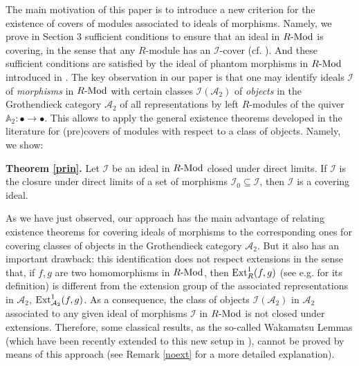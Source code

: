 \documentclass[11pt]{amsart}
\begin{document}
{The main motivation of this paper is to introduce a new criterion for the existence of covers of modules associated to ideals of morphisms. Namely, we prove in Section 3  sufficient conditions to ensure  that an ideal in $R{\textrm{-}{\rm Mod}}$ is covering, in the sense that any $R$-module has an $\mathcal I$-cover (cf. \cite{FGHT}). And these sufficient conditions are satisfied by the ideal of phantom morphisms in $R{\textrm{-}{\rm Mod}}$ introduced in \cite{Herzog1}. The key observation in our paper is that one may identify ideals $\mathcal I$ of \emph{morphisms} in $R{\textrm{-}{\rm Mod}}$ with certain classes ${\mathcal I(\mathcal A_2)}$ of \emph{objects} in the Grothendieck category $\mathcal A_2$ of all representations by left $R$-modules of the quiver $\mathbb{A}_2:\bullet\to \bullet$. This allows to apply the general existence theorems developed in the literature for (pre)covers of modules with respect to a class of objects. Namely, we show:

\medskip\par\noindent
{\bf Theorem \ref{prin}.} Let $\mathcal I$ be an ideal in $R{\textrm{-}{\rm Mod}}$ closed under direct limits. If $\mathcal I$ is the closure under direct limits of a set of morphisms $\mathcal I_0\subseteq\mathcal I$, then $\mathcal I$ is a covering ideal.
\smallskip

As we have just observed, our approach has the main  advantage of relating existence theorems for covering ideals of morphisms to the corresponding ones for covering classes of objects in the Grothendieck category $\mathcal A_2$. But  it also has an important drawback: this identification does not respect extensions in the sense that, if $f,g$ are two homomorphisms in $R{\textrm{-}{\rm Mod}}$, 
then ${\mathop{\rm Ext}\nolimits}^1_R(f,g)$ (see e.g. \cite{FGHT} for its definition) is different from the extension group of the associated representations in $\mathcal A_2$, 
${\mathop{\rm Ext}\nolimits}^1_{\mathcal A_2}(f,g)$. 
As a consequence, the class of objects ${\mathcal I(\mathcal A_2)}$ in $\mathcal A_2$ associated to any given  ideal of morphisms $\mathcal I$ in $R{\textrm{-}{\rm Mod}}$ is not closed under extensions. Therefore, some classical results, as the so-called Wakamatsu Lemmas (which have been recently extended to this new setup in \cite{FH2}), cannot be proved by means of this approach (see Remark \ref{noext} for a more detailed explanation).

}
\end{document}
